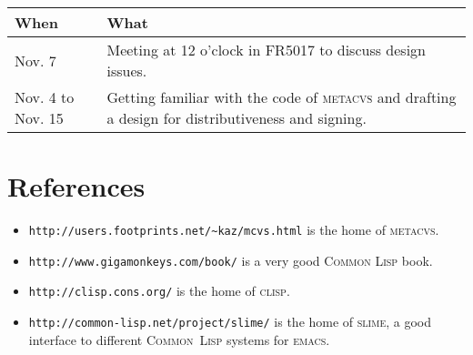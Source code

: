 \documentclass[german, 10pt, a4paper]{article}
\begin{document}
\begin{tabular}{|p{}|p{}|}
\hline
\textmd{When} & \textmd{What} \\
\hline\hline
Nov. 7 &
Meeting at 12 o'clock in FR5017 to discuss design issues. \\
\hline
Nov. 4 to Nov. 15 &
Getting familiar with the code of \textsc{metacvs}
and drafting a design for distributiveness and signing. \\
\hline
\end{tabular}

\section{References}

\begin{itemize}
\item \texttt{http://users.footprints.net/\textasciitilde{}kaz/mcvs.html} is the home of
\textsc{metacvs}.
\item \texttt{http://www.gigamonkeys.com/book/} is a very good
\textsc{Common Lisp} book.
\item \texttt{http://clisp.cons.org/} is the home of \textsc{clisp}.
\item \texttt{http://common-lisp.net/project/slime/} is the home of
\textsc{slime}, a good interface to different \textsc{Common~Lisp}
systems for \textsc{emacs}.
\end{itemize}
\end{document}
